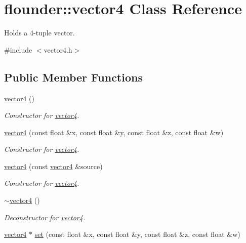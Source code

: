 \hypertarget{classflounder_1_1vector4}{}\section{flounder\+:\+:vector4 Class Reference}
\label{classflounder_1_1vector4}


Holds a 4-\/tuple vector.  




{\ttfamily \#include $<$vector4.\+h$>$}

\subsection*{Public Member Functions}
\begin{DoxyCompactItemize}
\item 
\hyperlink{classflounder_1_1vector4_ab2f9a25788fea44dcf9c748af1302897}{vector4} ()
\begin{DoxyCompactList}\small\item\em Constructor for \hyperlink{classflounder_1_1vector4}{vector4}. \end{DoxyCompactList}\item 
\hyperlink{classflounder_1_1vector4_aa319f876f373f25cd5ffa25dc92566c8}{vector4} (const float \&x, const float \&y, const float \&z, const float \&w)
\begin{DoxyCompactList}\small\item\em Constructor for \hyperlink{classflounder_1_1vector4}{vector4}. \end{DoxyCompactList}\item 
\hyperlink{classflounder_1_1vector4_af14114413eaf1ec39718c0045cbb3b6c}{vector4} (const \hyperlink{classflounder_1_1vector4}{vector4} \&source)
\begin{DoxyCompactList}\small\item\em Constructor for \hyperlink{classflounder_1_1vector4}{vector4}. \end{DoxyCompactList}\item 
\hyperlink{classflounder_1_1vector4_af9e1d52c2640d3b0128ee619e07d50ce}{$\sim$vector4} ()
\begin{DoxyCompactList}\small\item\em Deconstructor for \hyperlink{classflounder_1_1vector4}{vector4}. \end{DoxyCompactList}\item 
\hyperlink{classflounder_1_1vector4}{vector4} $\ast$ \hyperlink{classflounder_1_1vector4_a3a3f14d68f1339830065a542efc18bbb}{set} (const float \&x, const float \&y, const float \&z, const float \&w)

\end{DoxyCompactItemize}

